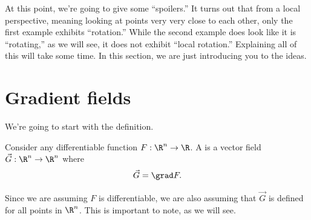 \documentclass{ximera}
\begin{document}
At this point, we're going to give some ``spoilers.'' It turns out
that from a local perspective, meaning looking at points very very
close to each other, only the first example exhibits ``rotation.''
While the second example does look like it is ``rotating,'' as we will
see, it does not exhibit ``local rotation.'' Explaining all of this
will take some time. In this section, we are just introducing you to
the ideas.


\section{Gradient fields}

We're going to start with the definition.

\begin{definition}
  Consider any differentiable function $F:\R^n\to \R$.
  A  is a vector field $\vec{G}:\R^n\to \R^n$ where
  \[
  \vec{G} = \grad F.
  \]
\end{definition}

Since we are assuming $F$ is differentiable, we are also assuming that
$\vec{G}$ is defined for all points in $\R^n$. This is important to
note, as we will see.
\end{document}
